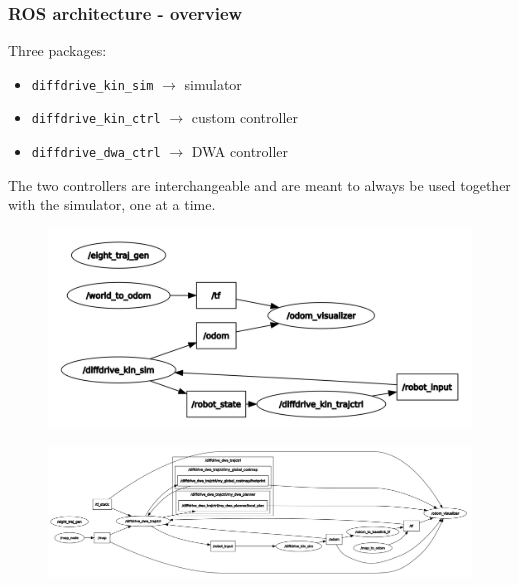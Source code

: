\documentclass{beamer}
\begin{document}
\begin{frame}[allowframebreaks]
\frametitle{ROS architecture - overview}

Three packages:
\begin{itemize}
  \item \texttt{diffdrive\_kin\_sim} $\rightarrow$ simulator
  \item \texttt{diffdrive\_kin\_ctrl} $\rightarrow$ custom controller
  \item \texttt{diffdrive\_dwa\_ctrl} $\rightarrow$ DWA controller
\end{itemize}

\vspace{2em}

The two controllers are interchangeable and are meant to always be used together
with the simulator, one at a time.

\framebreak

\begin{figure}[H]
    \centering
    \includegraphics[scale=0.14]{img/ros_tools/rqtgraph_custom.png}
\end{figure}

\vspace{-2em}

\begin{figure}[H]
    \centering
    \includegraphics[scale=0.17]{img/ros_tools/rqtgraph_dwa.png}
\end{figure}

\end{frame}
\end{document}
